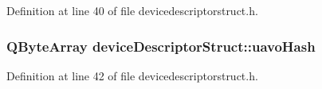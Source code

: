 Definition at line 40 of file devicedescriptorstruct.\-h.

\hypertarget{group___u_a_v_object_util_plugin_gaa4639a6c66d44d1f5e0bf6c22c5eec64}{
\subsubsection[{uavo\-Hash}]{\setlength{\rightskip}{0pt plus 5cm}Q\-Byte\-Array device\-Descriptor\-Struct\-::uavo\-Hash}}\label{group___u_a_v_object_util_plugin_gaa4639a6c66d44d1f5e0bf6c22c5eec64}


Definition at line 42 of file devicedescriptorstruct.\-h.

